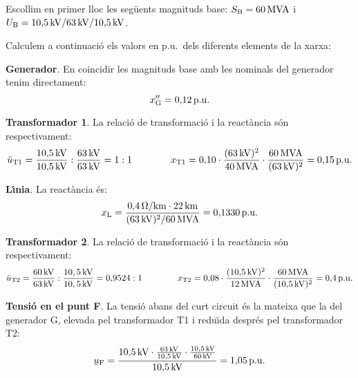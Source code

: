 \begin{exemple}
Escollim en primer lloc les seg\"{u}ents magnituds base: $S_\mathrm{B} = 60\mathrm{\,MVA}$ i $U_\mathrm{B}
= 10{,}5\mathrm{\,kV} / 63\mathrm{\,kV} / 10{,}5\mathrm{\,kV}$.

Calculem a continuaci\'{o} els valors en p.u.\ dels diferents elements de la xarxa:

\textbf{Generador}. En coincidir les magnituds base amb les nominals del generador tenim
 directament:
\[
x''_\mathrm{G} = 0{,}12\mathrm{\,p.u.}
\]

\textbf{Transformador 1}. La relaci\'{o} de transformaci\'{o} i la react\`{a}ncia s\'{o}n respectivament:
\[
\Ddot{u}_\mathrm{T1} = \frac{10{,}5\mathrm{\,kV}}{10{,}5\mathrm{\,kV}} : \frac{63\mathrm{\,kV}}{63\mathrm{\,kV}} = 1:1 \qquad\qquad x_\mathrm{T1} = 0{,}10 \cdot \frac{(63\mathrm{\,kV})^2}{40\mathrm{\,MVA}} \cdot \frac{60\mathrm{\,MVA}}{(63\mathrm{\,kV})^2}  = 0{,}15\mathrm{\,p.u.}
\]

\textbf{L\'{\i}nia}. La react\`{a}ncia \'{e}s:
\[x_\mathrm{L} = \frac{0{,}4\mathrm{\,\mathrm{\Omega}/km} \cdot 22\mathrm{\,km}} {(63\mathrm{\,kV})^2/60\mathrm{\,MVA}}  = 0{,}1330\mathrm{\,p.u.}
\]

\textbf{Transformador 2}. La relaci\'{o} de transformaci\'{o} i la react\`{a}ncia s\'{o}n respectivament:
\[
\Ddot{u}_\mathrm{T2} = \frac{60\mathrm{\,kV}}{63\mathrm{\,kV}} : \frac{10,5\mathrm{\,kV}}{10,5\mathrm{\,kV}} = 0{,}9524:1 \qquad\qquad x_\mathrm{T2} = 0{,}08 \cdot \frac{(10{,}5\mathrm{\,kV})^2}{12\mathrm{\,MVA}} \cdot \frac{60\mathrm{\,MVA}}{(10{,}5\mathrm{\,kV})^2}  = 0{,}4\mathrm{\,p.u.}
\]

\textbf{Tensi\'{o} en el punt F}. La tensi\'{o} abans del curt circuit \'{e}s la mateixa que la del generador G, elevada pel transformador T1 i redu\"{\i}da despr\'{e}s pel transformador T2:
\[
\cmplx{u}\ped{F} = \frac{10{,}5\unit{kV} \cdot \frac{63\unit{kV}}{10{,}5\unit{kV}} \cdot \frac{10{,}5\unit{kV}}{60\unit{kV}}}{10{,}5\unit{kV}} = 1{,}05\unit{p.u.}
\]


\end{exemple}
